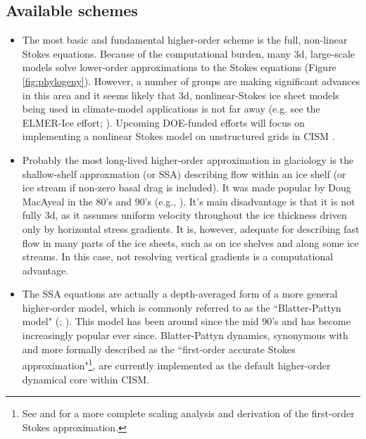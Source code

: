 \subsection{Available schemes}

\begin{itemize}
\item The most basic and fundamental higher-order scheme is the full, non-linear Stokes equations. Because of the computational burden, many 3d, large-scale models solve lower-order approximations to the Stokes equations (Figure \ref{fig:phylogeny}). However, a number of groups are making significant advances in this area and it seems likely that 3d, nonlinear-Stokes ice sheet models being used in climate-model applications is not far away (e.g. see the ELMER-Ice effort; \citet{gagliardini:2013iv}). Upcoming DOE-funded efforts will focus on implementing a nonlinear Stokes model on unstructured grids in CISM \citep{Leng:2012ia}.
\end{itemize}

\begin{itemize}
\item Probably the most long-lived higher-order approximation in glaciology is the shallow-shelf approxmation (or SSA) describing flow within an ice shelf (or ice stream if non-zero basal drag is included). It was made popular by Doug MacAyeal in the 80's and 90's (e.g., \citet{Macayeal:1989uo}). It's main disadvantage is that it is not fully 3d, as it assumes uniform velocity throughout the ice thickness driven only by horizontal stress gradients. It is, however, adequate for describing fast flow in many parts of the ice sheets, such as on ice shelves and along some ice streams. In this case, not resolving vertical gradients is a computational advantage.   
\end{itemize}

\begin{itemize}
\item The SSA equations are actually a depth-averaged form of a more general higher-order model, which is commonly referred to as the ``Blatter-Pattyn model" (\citet{BLATTER:1995wz}; \citet{Pattyn:2003tj}). This model has been around since the mid 90's and has become increasingly popular ever since. Blatter-Pattyn dynamics, synonymous with and more formally described as the ``first-order accurate Stokes approximation"\footnote{See \citet{Schoof:2010dl} and \citet{DUKOWICZ:2010wb} for a more complete scaling analysis and derivation of the first-order Stokes approximation.}, are currently implemented as the default higher-order dynamical core within CISM. 
\end{itemize}

